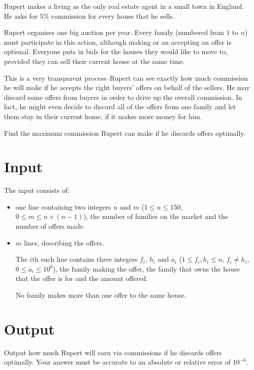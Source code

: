 
Rupert makes a living as the only real estate agent in a small town in England.
He asks for $5\%$ commission for every house that he sells.

Rupert organises one big auction per year. Every family (numbered from $1$ to
$n$) must participate in this action, although making or an accepting an offer
is optional. Everyone puts in bids for the houses they would like to move to,
provided they can sell their current house at the same time.

This is a very transparent process--Rupert can see exactly how much commission
he will make if he accepts the right buyers' offers on behalf of the sellers.
He may discard some offers from buyers in order to drive up the overall
commission. In fact, he might even decide to discard all of the offers from one
family and let them stay in their current home, if it makes more money for him.

Find the maximum commission Rupert can make if he discards offers optimally.

\section*{Input}

The input consists of:
\begin{itemize}
    \item one line containing two integers $n$ and $m$ ($1 \leq n \leq 150$, $0
    \leq m \leq n\times(n-1)$), the number of families on the market and the number
    of offers made.
    \item $m$ lines, describing the offers.

    The $i$th such line contains three integers $f_i$, $h_i$ and $a_i$ ($1 \leq
    f_i, h_i \leq n$, $f_i \neq h_i$, $0 \leq a_i \leq 10^6$), the family
    making the offer, the family that owns the house that the offer is for and
    the amount offered.

    No family makes more than one offer to the same house.
\end{itemize}

\section*{Output}
Output how much Rupert will earn via commissions if he discards offers optimally.
Your answer must be accurate to an absolute or relative error of $10^{-6}$.
